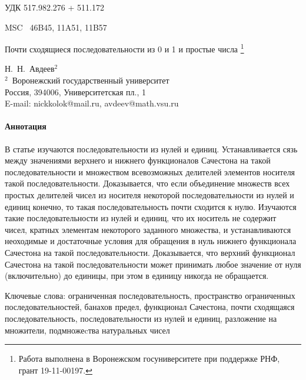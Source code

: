 \documentclass[a4paper,openbib]{article}
\theoremstyle{definition}
\begin{document}
УДК  { 517.982.276 %
     + 511.172    }%

MSC~
	46B45,
	11A51,
	11B57



\begin{center}
	Почти сходящиеся последовательности из 0 и 1 и простые числа
	\footnote{
		Работа выполнена в Воронежском госуниверситете при поддержке РНФ, грант 19-11-00197.
	}
\end{center}

\begin{center}
	{Н.~Н.~Авдеев$^{2}$\\[4pt]}
	{\rm\footnotesize{$^2$\,
	Воронежский государственный университет\\
	Россия, 394006, Университетская пл., 1\\
	E-mail: nickkolok@mail.ru, avdeev@math.vsu.ru}}
\end{center}



\paragraph{Аннотация}
В статье изучаются последовательности из нулей и единиц.
Устанавливается сязь между значениями верхнего и нижнего функционалов Сачестона
на такой последовательности и множеством всевозможных делителей
элементов носителя такой последовательности.
Доказывается, что если объединение множеств всех простых делителей чисел из носителя некоторой последовательности
из нулей и единиц конечно, то такая последовательность почти сходится к нулю.
Изучаются такие последовательности из нулей и единиц,
что их носитель не содержит чисел,
кратных элементам некоторого заданного множества,
и устанавливаются неоходимые и достаточные условия для обращения в нуль нижнего функционала Сачестона
на такой последовательности.
Доказывается, что верхний функционал Сачестона на такой последовательности
может принимать любое значение от нуля (включительно) до единицы,
при этом в единицу никогда не обращается.



Ключевые слова:
	ограниченная последовательность,
	пространство ограниченных последовательностей,
	банахов предел,
	функционал Сачестона,
	почти сходящаяся последовательность,
	последовательности из нулей и единиц,
	разложение на множители,
	подмножеcтва натуральных чисел
\end{document}
